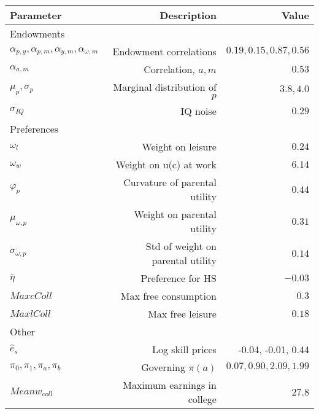 \begin{tabular}{lrr}
\hline
Parameter & Description  & Value  \\
\hline
Endowments &   &   \\
$\alpha_{p,y}, \alpha_{p,m}, \alpha_{y,m}, \alpha_{\omega,m}$ & Endowment correlations  & $0.19, 0.15, 0.87, 0.56$  \\
$\alpha_{a,m}$ & Correlation, $a,m$  & $0.53$  \\
$\mu_{p}, \sigma_{p}$ & Marginal distribution of $p$  & $3.8, 4.0$  \\
$\sigma_{IQ}$ & IQ noise  & $0.29$  \\
Preferences &   &   \\
$\omega_{l}$ & Weight on leisure  & $0.24$  \\
$\omega_{w}$ & Weight on u(c) at work  & $6.14$  \\
$\varphi_{p}$ & Curvature of parental utility  & $0.44$  \\
$\mu_{\omega,p}$ & Weight on parental utility  & $0.31$  \\
$\sigma_{\omega,p}$ & Std of weight on parental utility  & $0.14$  \\
$\bar{\eta}$ & Preference for HS  & $-0.03$  \\
$Max cColl$ & Max free consumption  & $0.3$  \\
$Max lColl$ & Max free leisure  & $0.18$  \\
Other &   &   \\
$\hat{e}_{s}$ & Log skill prices  & -0.04, -0.01, 0.44  \\
$\pi_{0}, \pi_{1}, \pi_{a}, \pi_{b}$ & Governing $\pi(a)$  & $0.07, 0.90, 2.09, 1.99$  \\
$Mean w_{coll}$ & Maximum earnings in college  & $27.8$  \\
\hline
\end{tabular}%
